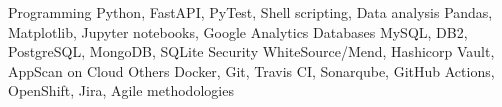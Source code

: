 %
%
%

    \begin{keywords}
        \keywordsentry
            {Programming}
            {
                Python,
                FastAPI,
                PyTest,
                Shell scripting,
            }
        \keywordsentry
            {Data analysis}
            {
                Pandas,
                Matplotlib,
                Jupyter notebooks,
                Google Analytics
            }
        \keywordsentry
            {Databases}
            {
                MySQL,
                DB2,
                PostgreSQL,
                MongoDB,
                SQLite
            }
        \keywordsentry
            {Security}
            {
                WhiteSource/Mend,
                Hashicorp Vault,
                AppScan on Cloud
            }
        \keywordsentry
            {Others}
            {
            	Docker,
                Git,
                Travis CI,
                Sonarqube,
                GitHub Actions,
                OpenShift,
                Jira,
                Agile methodologies
            }
    \end{keywords}
